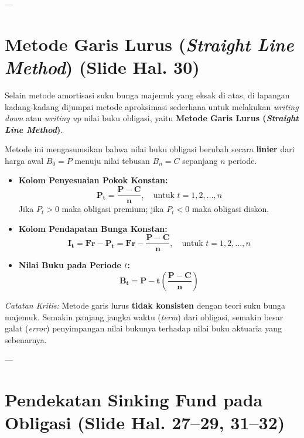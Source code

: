 \documentclass[11pt,a4paper]{article}
\begin{document}
---

\section{Metode Garis Lurus (\textit{Straight Line Method}) (Slide Hal. 30)}

Selain metode amortisasi suku bunga majemuk yang eksak di atas, di lapangan kadang-kadang dijumpai metode aproksimasi sederhana untuk melakukan \textit{writing down} atau \textit{writing up} nilai buku obligasi, yaitu \textbf{Metode Garis Lurus (\textit{Straight Line Method})}.

\begin{definitionbox}
Metode ini mengasumsikan bahwa nilai buku obligasi berubah secara \textbf{linier} dari harga awal $B_0 = P$ menuju nilai tebusan $B_n = C$ sepanjang $n$ periode.
\begin{itemize}
    \item \textbf{Kolom Penyesuaian Pokok Konstan:}
    \begin{equation}
        \mathbf{P_t = \frac{P - C}{n}}, \quad \text{untuk } t = 1, 2, \dots, n
    \end{equation}
    Jika $P_t > 0$ maka obligasi premium; jika $P_t < 0$ maka obligasi diskon.
    \item \textbf{Kolom Pendapatan Bunga Konstan:}
    \begin{equation}
        \mathbf{I_t = Fr - P_t = Fr - \frac{P - C}{n}}, \quad \text{untuk } t = 1, 2, \dots, n
    \end{equation}
    \item \textbf{Nilai Buku pada Periode $t$:}
    \begin{equation}
        \mathbf{B_t = P - t \left( \frac{P - C}{n} \right)}
    \end{equation}
\end{itemize}
\textit{Catatan Kritis:} Metode garis lurus \textbf{tidak konsisten} dengan teori suku bunga majemuk. Semakin panjang jangka waktu (\textit{term}) dari obligasi, semakin besar galat (\textit{error}) penyimpangan nilai bukunya terhadap nilai buku aktuaria yang sebenarnya.
\end{definitionbox}

---

\section{Pendekatan Sinking Fund pada Obligasi (Slide Hal. 27--29, 31--32)}
\end{document}
